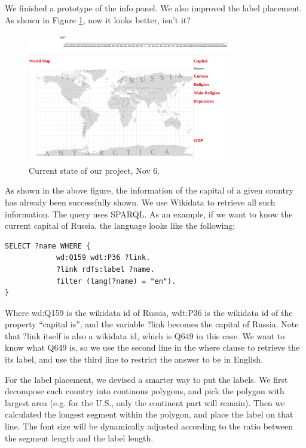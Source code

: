 \documentclass[12pt, fullpage,letterpaper]{article}
\begin{document}
We finished a prototype of the info panel. We also improved the label placement.
As shown in Figure \ref{fig:nov6}, now it looks better, isn't it?

\begin{figure}[h!]
    \begin{center}
        \includegraphics[width=0.8\textwidth]{figs/Nov6.png}
        \caption{Current state of our project, Nov 6.}
        \label{fig:nov6}
    \end{center}
\end{figure}

As shown in the above figure, the information of the capital of a given country
has already been successfully shown. We use Wikidata to retrieve all such information.
The query uses SPARQL. As an example, if we want to know the current capital of Russia,
the language looks like the following:

\begin{verbatim}
SELECT ?name WHERE {
            wd:Q159 wdt:P36 ?link.
            ?link rdfs:label ?name.
            filter (lang(?name) = "en").
}
\end{verbatim}

Where wd:Q159 is the wikidata id of Russia, wdt:P36 is the wikidata id of the property ``capital is'',
and the variable ?link becomes the capital of Russia. Note that ?link itself is also a wikidata id,
which is Q649 in this case. We want to know what Q649 is, so we use the second line in the where clause to retrieve
the its label, and use the third line to restrict the answer to be in English.

For the label placement, we devised a smarter way to put the labels. We first decompose
each country into continous polygons, and pick the polygon with largest area (e.g. for the U.S., only the continent part will remain).
Then we calculated the longest segment within the polygon, and place the label on that line.
The font size will be dynamically adjusted according to the ratio between the segment length and the label length.
\end{document}
